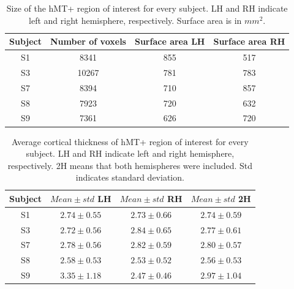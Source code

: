 \begin{table}[htbp!]
\centering
\caption{Size of the hMT+ region of interest for every subject. LH and RH indicate left and right hemisphere, respectively. Surface area is in $mm^2$.}
\begin{tabular}{cccc}
\\
\toprule
Subject & Number of voxels & Surface area LH & Surface area RH
\\
\midrule
S1 & 8341 & 855 & 517\\
S3 & 10267 & 781 & 783\\
S7 & 8394 & 710 & 857\\
S8 & 7923 & 720 & 632\\
S9 & 7361 & 626 & 720\\
\bottomrule
\end{tabular}
\label{tab:rois}
\end{table}

\begin{table}[htbp!]
\centering
\caption{Average cortical thickness of hMT+ region of interest for every subject. LH and RH indicate left and right hemisphere, respectively. 2H means that both hemispheres were included. Std indicates standard deviation.}
\begin{tabular}{cccc}
\\
\toprule
Subject & $Mean\pm std$ LH & $Mean\pm std$ RH & $Mean\pm std$ 2H 
\\
\midrule
S1 & $2.74\pm0.55$ &  $2.73\pm0.66$ &  $2.74\pm0.59$\\
S3 & $2.72\pm0.56$ &  $2.84\pm0.65$ &  $2.77\pm0.61$\\
S7 & $2.78\pm0.56$ &  $2.82\pm0.59$ &  $2.80\pm0.57$\\
S8 & $2.58\pm0.53$ &  $2.53\pm0.52$ &  $2.56\pm0.53$\\
S9 & $3.35\pm1.18$ &  $2.47\pm0.46$ &  $2.97\pm1.04$\\
\bottomrule
\end{tabular}
\label{tab:thickness}
\end{table}

